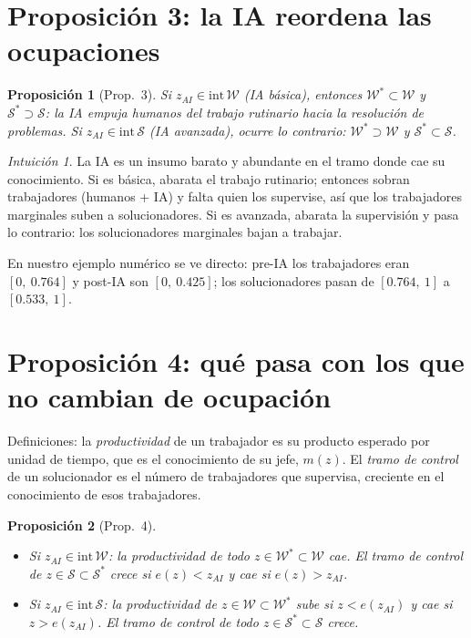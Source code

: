 \documentclass[11pt]{article}
\newtheorem{proposicion}{Proposición}
\theoremstyle{definition}
\theoremstyle{remark}
\newtheorem*{intuicion}{Intuición}
\newcommand{\zai}{z_{AI}}
\newcommand{\W}{\mathcal W}
\newcommand{\Sset}{\mathcal S}
\begin{document}
\section{Proposición 3: la IA reordena las ocupaciones}

\begin{proposicion}[Prop.~3]
Si $\zai\in\text{int}\,\W$ (IA \emph{básica}), entonces $\W^{*}\subset\W$ y $\Sset^{*}\supset\Sset$: la IA
empuja humanos del trabajo rutinario hacia la resolución de problemas. Si $\zai\in\text{int}\,\Sset$
(IA \emph{avanzada}), ocurre lo contrario: $\W^{*}\supset\W$ y $\Sset^{*}\subset\Sset$.
\end{proposicion}

\begin{intuicion}
La IA es un insumo barato y abundante en el tramo donde cae su conocimiento. Si es básica, abarata el
trabajo rutinario; entonces sobran trabajadores (humanos + IA) y falta quien los supervise, así que los
trabajadores marginales suben a solucionadores. Si es avanzada, abarata la supervisión y pasa lo
contrario: los solucionadores marginales bajan a trabajar.
\end{intuicion}

En nuestro ejemplo numérico se ve directo: pre-IA los trabajadores eran $[0,\ 0.764]$ y post-IA son
$[0,\ 0.425]$; los solucionadores pasan de $[0.764,\ 1]$ a $[0.533,\ 1]$.

\section{Proposición 4: qué pasa con los que no cambian de ocupación}

Definiciones: la \emph{productividad} de un trabajador es su producto esperado por unidad de tiempo,
que es el conocimiento de su jefe, $m(z)$. El \emph{tramo de control} de un solucionador es el número
de trabajadores que supervisa, creciente en el conocimiento de esos trabajadores.

\begin{proposicion}[Prop.~4]
\begin{itemize}
  \item Si $\zai\in\text{int}\,\W$: la productividad de todo $z\in\W^{*}\subset\W$ cae. El tramo de
  control de $z\in\Sset\subset\Sset^{*}$ crece si $e(z)<\zai$ y cae si $e(z)>\zai$.
  \item Si $\zai\in\text{int}\,\Sset$: la productividad de $z\in\W\subset\W^{*}$ sube si $z<e(\zai)$ y
  cae si $z>e(\zai)$. El tramo de control de todo $z\in\Sset^{*}\subset\Sset$ crece.
\end{itemize}
\end{proposicion}
\end{document}

